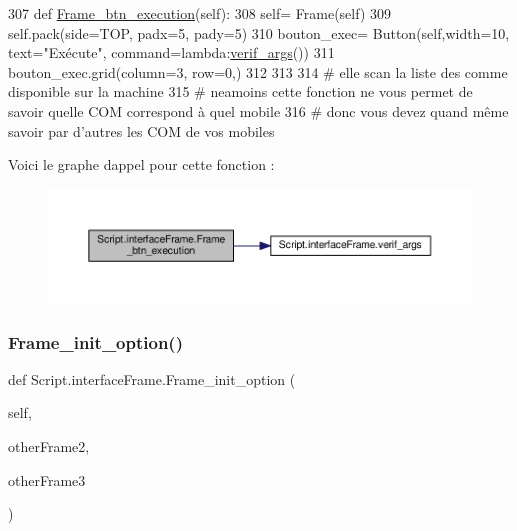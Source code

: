 \begin{DoxyCode}
307 \textcolor{keyword}{def }\hyperlink{namespaceScript_1_1interfaceFrame_ae94a2df22674070fddf2ae5197a09a6f}{Frame\_btn\_execution}(self):
308     self= Frame(self)
309     self.pack(side=TOP, padx=5, pady=5)
310     bouton\_exec= Button(self,width=10, text=\textcolor{stringliteral}{"Exécute"}, command=\textcolor{keyword}{lambda}:\hyperlink{namespaceScript_1_1interfaceFrame_a7a90dd83e0b67edcf2dee870d927e98e}{verif\_args}())
311     bouton\_exec.grid(column=3, row=0,)
312 
313 
314 \textcolor{comment}{# elle scan la liste des comme disponible sur la machine
}
315 \textcolor{comment}{# neamoins cette fonction ne vous permet de savoir quelle COM correspond à quel mobile
}
316 \textcolor{comment}{# donc vous devez quand même savoir par d'autres les COM de vos mobiles
}
\end{DoxyCode}
Voici le graphe d\textquotesingle{}appel pour cette fonction \+:\nopagebreak
\begin{figure}[H]
\begin{center}
\leavevmode
\includegraphics[width=350pt]{namespaceScript_1_1interfaceFrame_ae94a2df22674070fddf2ae5197a09a6f_cgraph}
\end{center}
\end{figure}
\mbox{\label{namespaceScript_1_1interfaceFrame_aa7f559f2c9e8af048daa456cb3686155}} 
\subsubsection{\texorpdfstring{Frame\+\_\+init\+\_\+option()}{Frame\_init\_option()}}
{\footnotesize\ttfamily def Script.\+interface\+Frame.\+Frame\+\_\+init\+\_\+option (\begin{DoxyParamCaption}\item[{}]{self,  }\item[{}]{other\+Frame2,  }\item[{}]{other\+Frame3 }\end{DoxyParamCaption})}



